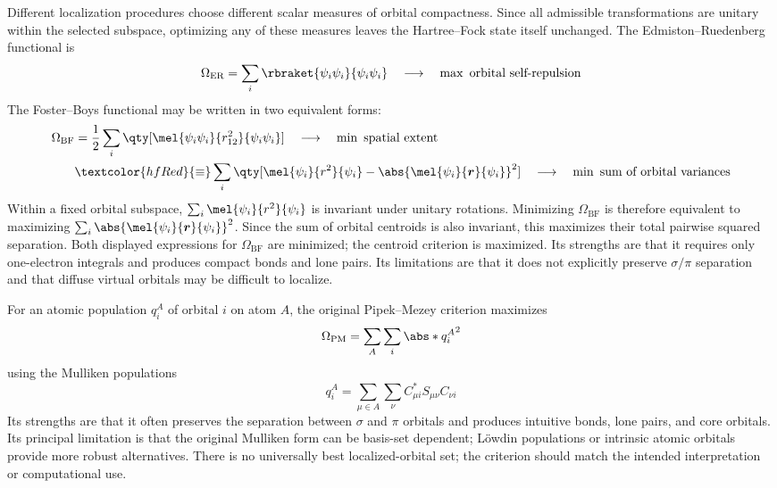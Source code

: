 \documentclass[11pt,a4paper,titlepage]{article}
\numberwithin{equation}{section}
\newcommand{\br}{\boldsymbol{r}}
\newcommand{\red}[1]{\textcolor{hfRed}{#1}}
\begin{document}
Different localization procedures choose different scalar measures of orbital
compactness. Since all admissible transformations are unitary within the
selected subspace, optimizing any of these measures leaves the Hartree--Fock
state itself unchanged.
The Edmiston--Ruedenberg functional \citep{EdmistonRuedenberg1963} is
\begin{equation}
    \Omega_\text{ER}
    =\sum_i\rbraket{\psi_i\psi_i}{\psi_i\psi_i}
    \quad\longrightarrow\quad
    \max\ \text{orbital self-repulsion}
\end{equation}
The Foster--Boys functional \citep{FosterBoys1960} may be written in two equivalent forms:
\begin{equation}
\begin{split}
  \Omega_\text{BF}
  &=\frac{1}{2}\sum_i
    \qty[\mel{\psi_i\psi_i}{r_{12}^2}{\psi_i\psi_i}]
    \quad\longrightarrow\quad
    \min\ \text{spatial extent}
  \\
  &\red{\equiv}\sum_i\qty[
    \mel{\psi_i}{r^2}{\psi_i}
    -\abs{\mel{\psi_i}{\br}{\psi_i}}^2]
    \quad\longrightarrow\quad
    \min\ \text{sum of orbital variances}
\end{split}
\end{equation}
Within a fixed orbital subspace, $\sum_i\mel{\psi_i}{r^2}{\psi_i}$ is
invariant under unitary rotations. Minimizing $\Omega_\text{BF}$ is therefore
equivalent to maximizing $\sum_i\abs{\mel{\psi_i}{\br}{\psi_i}}^2$.
Since the sum of orbital centroids is also invariant, this maximizes their
total pairwise squared separation. Both displayed expressions for
$\Omega_\text{BF}$ are minimized; the centroid criterion is maximized.
Its strengths are
that it requires only one-electron integrals and produces compact bonds and
lone pairs. Its limitations are that it does not explicitly preserve
$\sigma/\pi$ separation and that diffuse virtual orbitals may be difficult
to localize.

For an atomic population $q_i^A$ of orbital $i$ on atom $A$, the original
Pipek--Mezey criterion \citep{PipekMezey1989} maximizes
\begin{equation}
    \Omega_\text{PM}=\sum_A\sum_i\abs*{q_i^A}^2
\end{equation}
using the Mulliken populations
\begin{equation}
  q_i^A
  =\sum_{\mu\in A}\sum_\nu
    C_{\mu i}^*S_{\mu\nu}C_{\nu i}
\end{equation}
Its strengths are
that it often preserves the separation between $\sigma$ and $\pi$ orbitals
and produces intuitive bonds, lone pairs, and core orbitals. Its principal
limitation is that the original Mulliken form can be basis-set dependent;
L\"owdin populations or intrinsic atomic orbitals provide more robust
alternatives.
There is no universally best localized-orbital set; the criterion should
match the intended interpretation or computational use.
\end{document}

